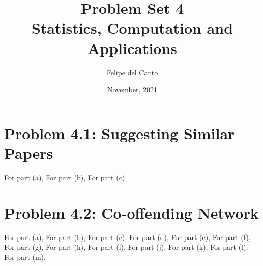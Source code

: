 \documentclass[11pt, english]{article}
\title{\bf Problem Set 4 \\ Statistics, Computation and
Applications\\[-1ex]}
\author{Felipe del Canto}
\date{November, 2021}
\begin{document}
    
\maketitle
   
\begin{multicols}{2}

\section*{Problem 4.1: Suggesting Similar Papers}

For part (a),
For part (b),
For part (c),

\section*{Problem 4.2: Co-offending Network}

For part (a),
For part (b),
For part (c),
For part (d),
For part (e),
For part (f),
For part (g),
For part (h),
For part (i),
For part (j),
For part (k),
For part (l),
For part (m),
  

\end{multicols}
\end{document}
